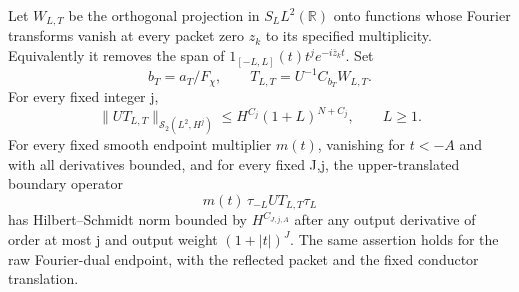 \begin{lemma}\label{lem:allpole-boundary-bound}
Let $W_{L,T}$ be the orthogonal projection in $S_LL^2(\mathbb R)$
onto functions whose Fourier transforms vanish at every packet
zero $z_k$ to its specified multiplicity.  Equivalently it removes
the span of $1_{[-L,L]}(t)t^j e^{-i\overline z_k t}$.
Set
\[
 b_T=a_T/F_\chi,\qquad T_{L,T}=U^{-1}C_{b_T}W_{L,T}.
\]
For every fixed integer j,
\begin{equation}\label{eq:allpole-bulk-size}
 \|UT_{L,T}\|_{\mathcal S_2(L^2,H^j)}
       \leq H^{C_j}(1+L)^{N+C_j},\qquad L\geq1.
\end{equation}
For every fixed smooth endpoint multiplier $m(t)$, vanishing for
$t<-A$ and with all derivatives bounded, and for every fixed J,j,
the upper-translated boundary operator
\[
 m(t)\,\tau_{-L}UT_{L,T}\tau_L
\]
has Hilbert--Schmidt norm bounded by $H^{C_{J,j,A}}$ after any
output derivative of order at most j and output weight
$(1+|t|)^J$.
The same assertion holds for the raw Fourier-dual endpoint,
with the reflected packet and the fixed conductor translation.
\end{lemma}


